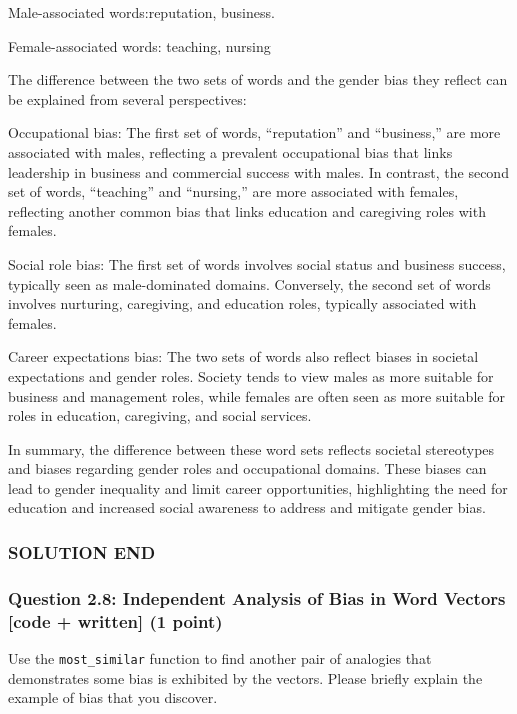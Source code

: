 \documentclass[11pt]{article}
\begin{document}
Male-associated words:reputation, business.

Female-associated words: teaching, nursing

The difference between the two sets of words and the gender bias they
reflect can be explained from several perspectives:

Occupational bias: The first set of words, ``reputation'' and
``business,'' are more associated with males, reflecting a prevalent
occupational bias that links leadership in business and commercial
success with males. In contrast, the second set of words, ``teaching''
and ``nursing,'' are more associated with females, reflecting another
common bias that links education and caregiving roles with females.

Social role bias: The first set of words involves social status and
business success, typically seen as male-dominated domains. Conversely,
the second set of words involves nurturing, caregiving, and education
roles, typically associated with females.

Career expectations bias: The two sets of words also reflect biases in
societal expectations and gender roles. Society tends to view males as
more suitable for business and management roles, while females are often
seen as more suitable for roles in education, caregiving, and social
services.

In summary, the difference between these word sets reflects societal
stereotypes and biases regarding gender roles and occupational domains.
These biases can lead to gender inequality and limit career
opportunities, highlighting the need for education and increased social
awareness to address and mitigate gender bias.

\subsubsection{SOLUTION END}\label{solution-end}

    \subsubsection{Question 2.8: Independent Analysis of Bias in Word
Vectors {[}code + written{]} (1
point)}\label{question-2.8-independent-analysis-of-bias-in-word-vectors-code-written-1-point}

Use the \texttt{most\_similar} function to find another pair of
analogies that demonstrates some bias is exhibited by the vectors.
Please briefly explain the example of bias that you discover.
\end{document}
